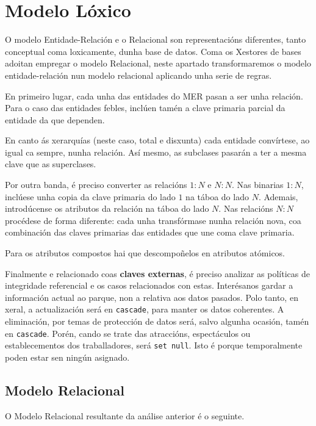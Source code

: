 \documentclass[12pt,a4paper]{book}
\theoremstyle{definition}
\theoremstyle{break}
\begin{document}
\chapter{Modelo Lóxico}
O modelo Entidade-Relación e o Relacional son representacións diferentes, tanto conceptual coma loxicamente, dunha base de datos. Coma os Xestores de bases adoitan empregar o modelo Relacional, neste apartado transformaremos o modelo entidade-relación nun modelo relacional aplicando unha serie de regras.

En primeiro lugar, cada unha das entidades do MER pasan a ser unha relación. Para o caso das entidades febles, inclúen tamén a clave primaria parcial da entidade da que dependen.

En canto ás xerarquías (neste caso, total e disxunta) cada entidade convírtese, ao igual ca sempre, nunha relación. Así mesmo, as subclases pasarán a ter a mesma clave que as superclases.

Por outra banda, é preciso converter as relacións $1:N$ e $N:N$. Nas binarias $1:N$, inclúese unha copia da clave primaria do lado $1$ na táboa do lado $N$. Ademais, introdúcense os atributos da relación na táboa do lado $N$. Nas relacións $N:N$ procédese de forma diferente: cada unha transfórmase nunha relación nova, coa combinación das claves primarias das entidades que une coma clave primaria.

Para os atributos compostos hai que descompoñelos en atributos atómicos.

Finalmente e relacionado coas \textbf{claves externas}, é preciso analizar as políticas de integridade referencial e os casos relacionados con estas. Interésanos gardar a información actual ao parque, non a relativa aos datos pasados. Polo tanto, en xeral, a actualización será en \texttt{cascade}, para manter os datos coherentes. A eliminación, por temas de protección de datos será, salvo algunha ocasión, tamén en \texttt{cascade}. Porén, cando se trate das atraccións, espectáculos ou establecementos dos traballadores, será \texttt{set null}. Isto é porque temporalmente poden estar sen ningún asignado.

\newpage
\section{Modelo Relacional}
O Modelo Relacional resultante da análise anterior é o seguinte.
\end{document}
